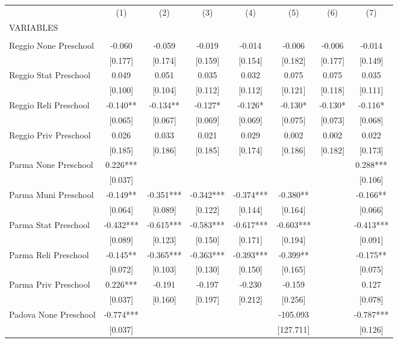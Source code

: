 \begin{tabular}{lccccccc} \hline
 & (1) & (2) & (3) & (4) & (5) & (6) & (7) \\
VARIABLES &  &  &  &  &  &  &  \\ \hline
 &  &  &  &  &  &  &  \\
Reggio None Preschool & -0.060 & -0.059 & -0.019 & -0.014 & -0.006 & -0.006 & -0.014 \\
 & [0.177] & [0.174] & [0.159] & [0.154] & [0.182] & [0.177] & [0.149] \\
Reggio Stat Preschool & 0.049 & 0.051 & 0.035 & 0.032 & 0.075 & 0.075 & 0.035 \\
 & [0.100] & [0.104] & [0.112] & [0.112] & [0.121] & [0.118] & [0.111] \\
Reggio Reli Preschool & -0.140** & -0.134** & -0.127* & -0.126* & -0.130* & -0.130* & -0.116* \\
 & [0.065] & [0.067] & [0.069] & [0.069] & [0.075] & [0.073] & [0.068] \\
Reggio Priv Preschool & 0.026 & 0.033 & 0.021 & 0.029 & 0.002 & 0.002 & 0.022 \\
 & [0.185] & [0.186] & [0.185] & [0.174] & [0.186] & [0.182] & [0.173] \\
Parma None Preschool & 0.226*** &  &  &  &  &  & 0.288*** \\
 & [0.037] &  &  &  &  &  & [0.106] \\
Parma Muni Preschool & -0.149** & -0.351*** & -0.342*** & -0.374*** & -0.380** &  & -0.166** \\
 & [0.064] & [0.089] & [0.122] & [0.144] & [0.164] &  & [0.066] \\
Parma Stat Preschool & -0.432*** & -0.615*** & -0.583*** & -0.617*** & -0.603*** &  & -0.413*** \\
 & [0.089] & [0.123] & [0.150] & [0.171] & [0.194] &  & [0.091] \\
Parma Reli Preschool & -0.145** & -0.365*** & -0.363*** & -0.393*** & -0.399** &  & -0.175** \\
 & [0.072] & [0.103] & [0.130] & [0.150] & [0.165] &  & [0.075] \\
Parma Priv Preschool & 0.226*** & -0.191 & -0.197 & -0.230 & -0.159 &  & 0.127 \\
 & [0.037] & [0.160] & [0.197] & [0.212] & [0.256] &  & [0.078] \\
Padova None Preschool & -0.774*** &  &  &  & -105.093 &  & -0.787*** \\
 & [0.037] &  &  &  & [127.711] &  & [0.126] \\

\end{tabular}
